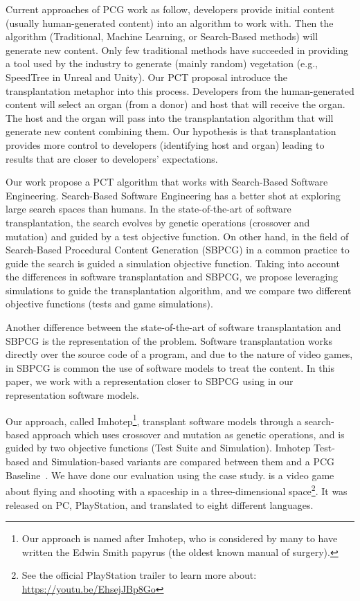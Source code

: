 Current approaches of PCG work as follow, developers provide initial content (usually human-generated content) into an algorithm to work with. Then the algorithm (Traditional, Machine Learning, or Search-Based methods) will generate new content. Only few traditional methods have succeeded in providing a tool used by the industry to generate (mainly random) vegetation (e.g., SpeedTree in Unreal and Unity).
Our PCT proposal introduce the transplantation metaphor into this process. Developers from the human-generated content will select an organ (from a donor) and host that will receive the organ. The host and the organ will pass into the transplantation algorithm that will generate new content combining them. Our hypothesis is that transplantation provides more control to developers (identifying host and organ) leading to results that are closer to developers’ expectations.

Our work propose a PCT algorithm that works with Search-Based Software Engineering.
Search-Based Software Engineering has a better shot at exploring large search spaces than humans. In the state-of-the-art of software transplantation, the search evolves by genetic operations (crossover and mutation) and guided by a test objective function. On other hand, in the field of Search-Based Procedural Content Generation (SBPCG) in a common practice to guide the search is guided a simulation objective function.
Taking into account the differences in software transplantation and SBPCG, we propose leveraging simulations to guide the transplantation algorithm, and we compare two different objective functions (tests and game simulations).

Another difference between the state-of-the-art of software transplantation and SBPCG is the representation of the problem. Software transplantation works directly over the source code of a program, and due to the nature of video games, in SBPCG is common the use of software models to treat the content. 
In this paper, we work with a representation closer to SBPCG using in our representation software models.

Our approach, called Imhotep\footnote{Our approach is named after Imhotep, who is considered by many to have written the Edwin Smith papyrus (the oldest known manual of surgery).}, transplant software models through a search-based approach which uses crossover and mutation as genetic operations, and is guided by two objective functions (Test Suite and Simulation). Imhotep Test-based and Simulation-based variants are compared between them and a PCG Baseline~\cite{gallotta2022evolving}. We have done our evaluation using the \CaseStudy{} case study. \CaseStudy{} is a video game about flying and shooting with a spaceship in a three-dimensional space\footnote{See the official PlayStation trailer to learn more about: \CaseStudy{} \url{https://youtu.be/EhsejJBp8Go}}. It was released on PC, PlayStation, and translated to eight different languages.

